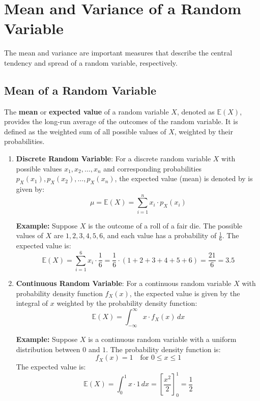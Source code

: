 \documentclass[twoside]{book}
\begin{document}
\section{Mean and Variance of a Random Variable}

The mean and variance are important measures that describe the central tendency and spread of a random variable, respectively.

\subsection{Mean of a Random Variable}

The \textbf{mean} or \textbf{expected value} of a random variable \( X \), denoted as \( \mathbb{E}(X) \), provides the long-run average of the outcomes of the random variable. It is defined as the weighted sum of all possible values of \( X \), weighted by their probabilities.
\begin{enumerate}

\item \textbf{Discrete Random Variable}: For a discrete random variable \( X \) with possible values \( x_1, x_2, \dots, x_n \) and corresponding probabilities \( p_X(x_1), p_X(x_2), \dots, p_X(x_n) \), the expected value (mean) is denoted by is given by:
\[
\mu=\mathbb{E}(X) = \sum_{i=1}^{n} x_i \cdot p_X(x_i)
\]

\textbf{Example:} Suppose \( X \) is the outcome of a roll of a fair die. The possible values of \( X \) are \( 1, 2, 3, 4, 5, 6 \), and each value has a probability of \( \frac{1}{6} \). The expected value is:
\[
\mathbb{E}(X) = \sum_{i=1}^{6} x_i \cdot \frac{1}{6} = \frac{1}{6} \cdot (1 + 2 + 3 + 4 + 5 + 6) = \frac{21}{6} = 3.5
\]

\item \textbf{Continuous Random Variable}: For a continuous random variable \( X \) with probability density function \( f_X(x) \), the expected value is given by the integral of \( x \) weighted by the probability density function:
\[
\mathbb{E}(X) = \int_{-\infty}^{\infty} x \cdot f_X(x) \, dx
\]

\textbf{Example:} Suppose \( X \) is a continuous random variable with a uniform distribution between \( 0 \) and \( 1 \). The probability density function is:
\[
f_X(x) = 1 \quad \text{for } 0 \leq x \leq 1
\]
The expected value is:
\[
\mathbb{E}(X) = \int_0^1 x \cdot 1 \, dx = \left[ \frac{x^2}{2} \right]_0^1 = \frac{1}{2}
\]
\end{enumerate}
\end{document}
